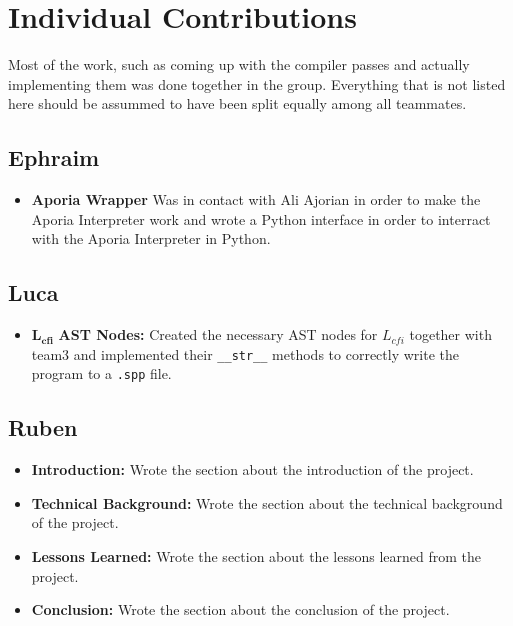 \section{Individual Contributions}
Most of the work, such as coming up with the compiler passes and actually implementing them was done together in the group. Everything that is not listed here should be assummed
to have been split equally among all teammates.
\subsection{Ephraim}

\begin{itemize}
	\item \textbf{Aporia Wrapper} Was in contact with Ali Ajorian in order to make the Aporia Interpreter work and wrote a Python interface in order to interract with the Aporia Interpreter in Python.
\end{itemize}

\subsection{Luca}

\begin{itemize}
	\item $\mathbf{L_{cfi}}$\textbf{ AST Nodes:} Created the necessary AST nodes for $L_{cfi}$ together with team3 and implemented their \texttt{\_\_str\_\_} methods to correctly write the program to a \texttt{.spp} file.
\end{itemize}

\subsection{Ruben}

\begin{itemize}
	\item \textbf{Introduction:} Wrote the section about the introduction of the project.
	\item \textbf{Technical Background:} Wrote the section about the technical background of the project.
	\item \textbf{Lessons Learned:} Wrote the section about the lessons learned from the project.
	\item \textbf{Conclusion:} Wrote the section about the conclusion of the project.
\end{itemize}

